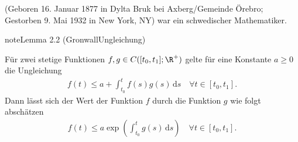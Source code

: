 \documentclass[letterpaper,10pt,german]{jupyterBook}
\begin{document}
\begin{sphinxShadowBox}

\sphinxAtStartPar
{} (Geboren 16. Januar 1877 in Dylta Bruk bei Axberg/Gemeinde Örebro; Gestorben 9. Mai 1932 in New York, NY) war ein schwedischer Mathematiker.
\end{sphinxShadowBox}
\label{odestability/ruhelagen:lemma:Gronwall}
\begin{sphinxadmonition}{note}{Lemma 2.2 (Gronwall\sphinxhyphen{}Ungleichung)}



\sphinxAtStartPar
Für zwei stetige Funktionen \(f,g\in C([t_0,t_1]; \R^+)\) gelte für eine Konstante \(a \geq 0\) die Ungleichung
\begin{equation*}
\begin{split}f(t) \leq a + \int_{t_0}^t f(s)g(s)\, \mathrm{d}s \quad \forall t\in [t_0,t_1].\end{split}
\end{equation*}
\sphinxAtStartPar
Dann lässt sich der Wert der Funktion \(f\) durch die Funktion \(g\) wie folgt abschätzen
\begin{equation*}
\begin{split}f(t) \leq a \exp{ \left(\int_{t_0}^t g(s)\, \mathrm{d}s \right)} \quad \forall t\in [t_0,t_1].\end{split}
\end{equation*}\end{sphinxadmonition}
\end{document}

